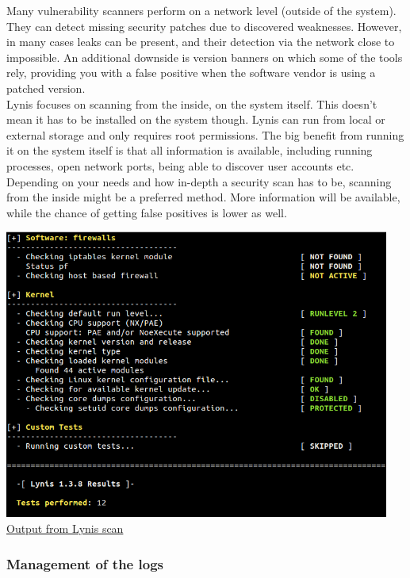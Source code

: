 Many vulnerability scanners perform on a network level (outside of the system). They can detect missing security patches due to discovered weaknesses. However, in many cases leaks can be present, and their detection via the network close to impossible. An additional downside is version banners on which some of the tools rely, providing you with a false positive when the software vendor is using a patched version.
\\

Lynis focuses on scanning from the inside, on the system itself. This doesn’t mean it has to be installed on the system though. Lynis can run from local or external storage and only requires root permissions. The big benefit from running it on the system itself is that all information is available, including running processes, open network ports, being able to discover user accounts etc.
\\

Depending on your needs and how in-depth a security scan has to be, scanning from the inside might be a preferred method. More information will be available, while the chance of getting false positives is lower as well.

\begin{center}
\includegraphics[width=0.95\textwidth]{images/lynis-example.png}
\\
\underline{Output from Lynis scan}
\end{center}

\pagebreak

\subsubsection{Management of the logs}


